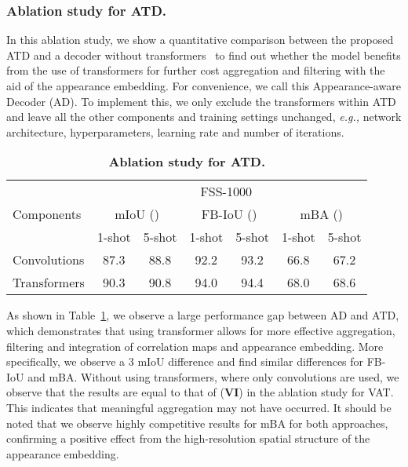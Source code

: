 \subsubsection{Ablation study for ATD.}
In this ablation study, we show a quantitative comparison between the proposed ATD and a decoder without transformers~\cite{vaswani2017attention,wang2020linformer,wu2021fastformer,liu2021swin} to find out whether the model benefits from the use of transformers for further cost aggregation and filtering with the aid of the appearance embedding. For convenience, we call this Appearance-aware Decoder (AD). To implement this, we only exclude the transformers within ATD and leave all the other components and training settings unchanged, \textit{e.g.,} network architecture, hyperparameters, learning rate and number of iterations.\vspace{-10pt}
\begin{table}[]
    \centering
   \begin{tabular}{l|cc|cc|cc}
\toprule
     \multirow{3}{*}{Components} &\multicolumn{6}{c}{FSS-1000~\cite{li2020fss}} \\
     &\multicolumn{2}{c}{mIoU ()}&\multicolumn{2}{c}{FB-IoU ()}&\multicolumn{2}{c}{mBA ()}\\
 &1-shot &5-shot &1-shot &5-shot &1-shot &5-shot\\  \midrule
Convolutions& 87.3&88.8&92.2&93.2&66.8&67.2\\
Transformers&90.3&90.8&94.0&94.4&68.0&68.6\\\bottomrule
    \end{tabular}
        \caption{\textbf{Ablation study for ATD. }}\label{tab:decoder}
\end{table}
As shown in Table~\ref{tab:decoder}, we observe a large performance gap between AD and ATD, which demonstrates that using transformer allows for more effective aggregation, filtering and integration of correlation maps and appearance embedding. More specifically, we observe a 3 mIoU difference and find similar differences for FB-IoU and mBA. Without using transformers, where only convolutions are used, we observe that the results are equal  to that of (\textbf{VI}) in the ablation study for VAT. This indicates that meaningful aggregation may not have occurred. It should be noted that we observe highly competitive results for mBA for both approaches, confirming a positive effect from the high-resolution spatial structure of the appearance embedding.\vspace{-10pt}  

